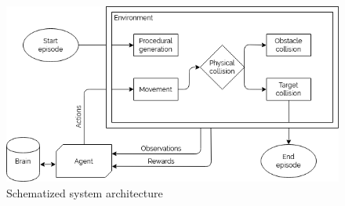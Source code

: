 \documentclass{ifacconf}
\begin{document}
\begin{figure}[!hb]
\begin{center}
\includegraphics[width=\linewidth]{res/agent.png} 
\caption{Schematized system architecture} 
\label{fig:agent_model}
\end{center}
\end{figure}
\end{document}
